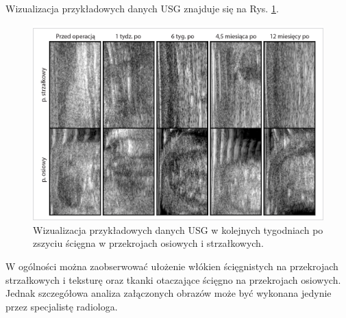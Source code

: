 Wizualizacja przykładowych danych USG znajduje się na Rys. \ref{fig:US_sample}.
\begin{figure}[h!]
	\includegraphics[width=\textwidth]{figures/Data_US_sample.jpg}
	\caption{Wizualizacja przykładowych danych USG w kolejnych tygodniach po zszyciu ścięgna w przekrojach osiowych i strzałkowych.}
	\label{fig:US_sample}
\end{figure}
W ogólności można zaobserwować ułożenie włókien ścięgnistych na przekrojach strzałkowych i teksturę oraz tkanki otaczające ścięgno na przekrojach osiowych. Jednak szczegółowa analiza załączonych obrazów może być wykonana jedynie przez specjalistę radiologa. 


